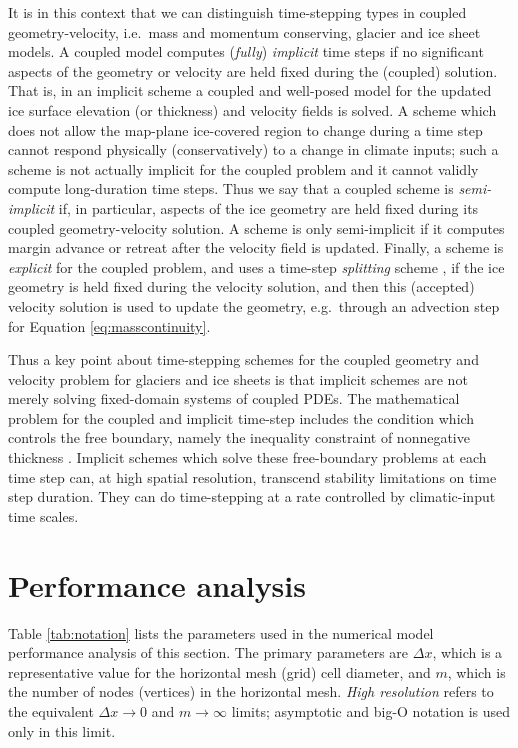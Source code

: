 \documentclass[review,letterpaper]{igs}
\begin{document}
It is in this context that we can distinguish time-stepping types in coupled geometry-velocity, i.e.~mass and momentum conserving, glacier and ice sheet models.  A coupled model computes (\emph{fully}) \emph{implicit} time steps if no significant aspects of the geometry or velocity are held fixed during the (coupled) solution.  That is, in an implicit scheme a coupled and well-posed model for the updated ice surface elevation (or thickness) and velocity fields is solved.  A scheme which does not allow the map-plane ice-covered region to change during a time step cannot respond physically (conservatively) to a change in climate inputs; such a scheme is not actually implicit for the coupled problem and it cannot validly compute long-duration time steps.  Thus we say that a coupled scheme is \emph{semi-implicit} if, in particular, aspects of the ice geometry are held fixed during its coupled geometry-velocity solution.  A scheme is only semi-implicit if it computes margin advance or retreat after the velocity field is updated.  Finally, a scheme is \emph{explicit} for the coupled problem, and uses a time-step \emph{splitting} scheme \citep{HundsdorferVerwer2003}, if the ice geometry is held fixed during the velocity solution, and then this (accepted) velocity solution is used to update the geometry, e.g.~through an advection step for Equation \eqref{eq:masscontinuity}.

Thus a key point about time-stepping schemes for the coupled geometry and velocity problem for glaciers and ice sheets is that implicit schemes are not merely solving fixed-domain systems of coupled PDEs.  The mathematical problem for the coupled and implicit time-step includes the condition which controls the free boundary, namely the inequality constraint of nonnegative thickness \citep{Bueler2021conservation}.  Implicit schemes which solve these free-boundary problems at each time step can, at high spatial resolution, transcend stability limitations on time step duration.  They can do time-stepping at a rate controlled by climatic-input time scales.


\section{Performance analysis}

Table \ref{tab:notation} lists the parameters used in the numerical model performance analysis of this section.  The primary parameters are $\Delta x$, which is a representative value for the horizontal mesh (grid) cell diameter, and $m$, which is the number of nodes (vertices) in the horizontal mesh.  \emph{High resolution} refers to the equivalent $\Delta x\to 0$ and $m\to\infty$ limits; asymptotic and big-O notation is used only in this limit.
\end{document}
